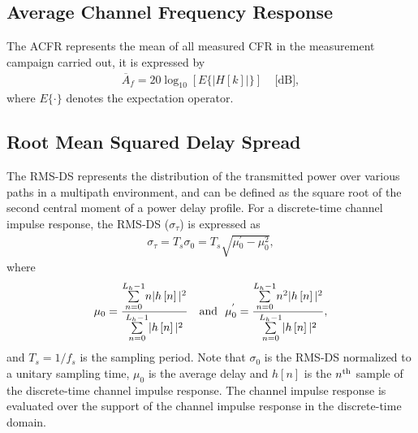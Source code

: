 \documentclass[journal]{IEEEtran}
\begin{document}
\subsection{Average Channel Frequency Response}
The \ac{ACFR} represents the mean of all measured \ac{CFR} in the measurement campaign carried out, it is expressed by
\begin{eqnarray}
\overline{A}_f=20\log_{10}\left[E\{|H[k]|\}\right] \ \ \ \ \ \mbox{[dB]},
\end{eqnarray}
where $E\{\cdot\}$ denotes the expectation operator.

\subsection{Root Mean Squared Delay Spread}
The RMS-DS represents the distribution of the transmitted power over various paths in a multipath environment,
and can be defined as the square root of the second central moment of a power delay profile.
For a discrete-time channel impulse response, the RMS-DS ($\sigma_{\tau}$) is expressed as
\begin{eqnarray}
	\sigma_{\tau}
	= T_{s}\sigma_{0}
	= T_{s}\sqrt{\mu{}_{0}^{'}-\mu_{0}^{2}},
\end{eqnarray}
where
\begin{eqnarray}
	\mu_{0}=\frac{\overset{L_h-1}{\underset{n=0}{\sum}}n|h\left[n\right]|^{2}}{\overset{L_h-1}{\underset{n=0}{\sum}}|h\left[n\right]|^{2}}\
	~~ {\rm and} ~~
	\mu_{0}^{'}=\frac{\overset{L_h-1}{\underset{n=0}{\sum}}n^{2}|h\left[n\right]|^{2}}{\overset{L_h-1}{\underset{n=0}{\sum}}|h\left[n\right]|^{2}},
\end{eqnarray}
and $T_s=1/f_s$ is the sampling period.
Note that $\sigma_{0}$ is the RMS-DS normalized to a unitary sampling time,
$\mu_{0}$ is the average delay
and $h[n]$ is the $n^{\rm th}$ sample of the discrete-time channel impulse response. The channel impulse response is evaluated over the support of the channel impulse response in the discrete-time domain.
\end{document}
